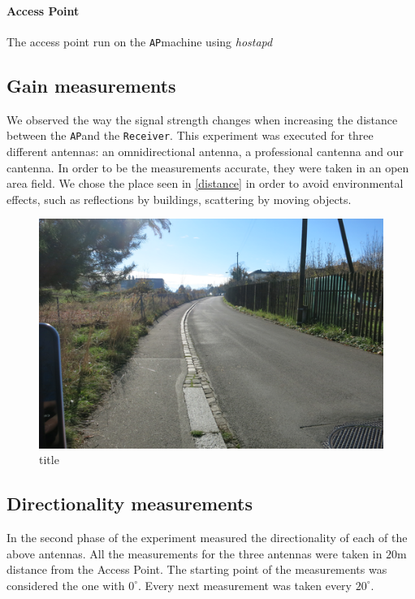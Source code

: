 \documentclass[12pt,a4paper]{article}
\newcommand{\rc}[0]{\texttt{Receiver}}
\newcommand{\ap}[0]{\texttt{AP}}
\begin{document}
		\paragraph{Access Point} The access point run on the \ap  machine using \emph{hostapd}
	
		\subsection{Gain measurements}
			We observed the way the signal strength changes when increasing the distance between the \ap and the \rc. This experiment was executed for three different antennas: an omnidirectional antenna, a professional cantenna and our cantenna.
			In order to be the measurements accurate, they were taken in an open area field. We chose the place seen in \autoref{distance} in order to avoid environmental effects, such as reflections by buildings, scattering by moving objects.
			\begin{figure}

				\includegraphics[width=\textwidth]{images/distance.png}

				\caption{title}
				\label{distance}
			\end{figure}
		
		\subsection{Directionality measurements}
			In the second phase of the experiment measured the directionality of each of the above antennas. All the measurements for the three antennas were taken in $20$m distance from the Access Point. The starting point of the measurements was considered the one with $0^{\circ}$. Every next measurement was taken every $20^{\circ}$.
\end{document}
